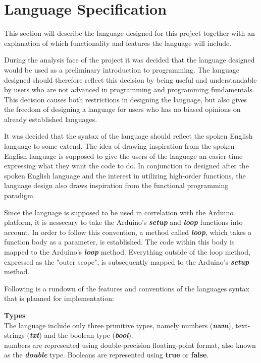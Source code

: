 \section{Language Specification}
This section will describe the language designed for this project together with an explanation of which functionality and features the language will include.

During the analysis face of the project it was decided that the language designed would be used as a preliminary introduction to programming.
The language designed should therefore reflect this decision by being useful and understandable by users who are not advanced in programming and programming fundamentals.
This decision causes both restrictions in designing the language, but also gives the freedom of designing a language for users who has no biased opinions on already established languages. 

It was decided that the syntax of the language should reflect the spoken English language to some extend.
The idea of drawing inspiration from the spoken English language is supposed to give the users of the language an easier time expressing what they want the code to do.
In conjunction to designed after the spoken English language and the interest in utilizing high-order functions, the language design also draws inspiration from the functional programming paradigm.

Since the language is supposed to be used in correlation with the Arduino platform, it is nessecary to take the Arduino's \textbf{\textit{setup}} and \textbf{\textit{loop}} functions into account.
In order to follow this convention, a method called \textbf{\textit{loop}}, which takes a function body as a parameter, is established. 
The code within this body is mapped to the Arduino's \textbf{\textit{loop}} method.
Everything outside of the loop method, expressed as the "outer scope", is subsequently mapped to the Arduino's \textbf{\textit{setup}} method.

Following is a rundown of the features and conventions of the languages syntax that is planned for implementation:

\textbf{Types}\\
The language include only three primitive types, namely numbers (\textbf{\textit{num}}), text-strings (\textbf{\textit{txt}}) and the boolean type (\textbf{\textit{bool}}).\\
numbers are represented using double-precision floating-point format, also known as the \textbf{\textit{double}} type.
Booleans are represented using \textbf{true} or \textbf{false}.

